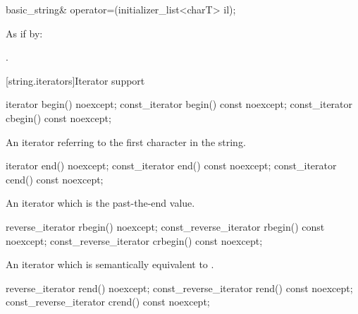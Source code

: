 %
\begin{itemdecl}
basic_string& operator=(initializer_list<charT> il);
\end{itemdecl}

\begin{itemdescr}
\pnum
\effects As if by: 

\pnum
\returns {}.
\end{itemdescr}

[string.iterators]{Iterator support}

%
%
\begin{itemdecl}
iterator       begin() noexcept;
const_iterator begin() const noexcept;
const_iterator cbegin() const noexcept;
\end{itemdecl}

\begin{itemdescr}
\pnum
\returns
An iterator referring to the first character in the string.
\end{itemdescr}

%
%
\begin{itemdecl}
iterator       end() noexcept;
const_iterator end() const noexcept;
const_iterator cend() const noexcept;
\end{itemdecl}

\begin{itemdescr}
\pnum
\returns
An iterator which is the past-the-end value.
\end{itemdescr}

%
%
\begin{itemdecl}
reverse_iterator       rbegin() noexcept;
const_reverse_iterator rbegin() const noexcept;
const_reverse_iterator crbegin() const noexcept;
\end{itemdecl}

\begin{itemdescr}
\pnum
\returns
An iterator which is semantically equivalent to
.
\end{itemdescr}

%
%
\begin{itemdecl}
reverse_iterator       rend() noexcept;
const_reverse_iterator rend() const noexcept;
const_reverse_iterator crend() const noexcept;
\end{itemdecl}

